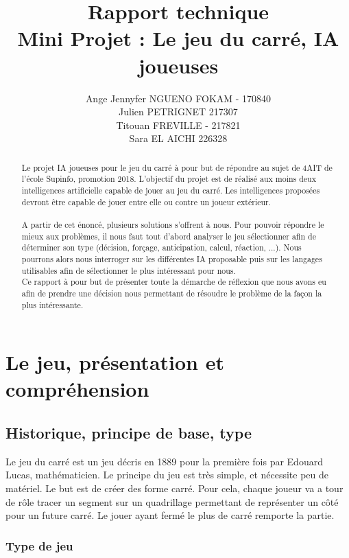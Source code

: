 \documentclass[a4paper,12pt]{report}
\title{Rapport technique \\Mini Projet : Le jeu du carré, IA joueuses}
\author{Ange Jennyfer NGUENO FOKAM - 170840\\Julien PETRIGNET 217307\\Titouan FREVILLE - 217821\\Sara EL AICHI 226328}
\begin{document}
\maketitle
\tableofcontents

\begin{abstract}
Le projet IA joueuses pour le jeu du carré à pour but de répondre au sujet de 4AIT de l'école Supinfo, promotion 2018. L'objectif du projet est de réalisé aux moins deux intelligences artificielle capable de jouer au jeu du carré. Les intelligences propos\'ees devront \^etre capable de jouer entre elle ou contre un joueur ext\'erieur. \\
\\
A partir de cet \'enonc\'e, plusieurs solutions s'offrent \`a nous. Pour pouvoir r\'epondre le mieux aux probl\`emes, il nous faut tout d'abord analyser le jeu s\'electionner afin de d\'eterminer son type (d\'ecision, for\c{c}age, anticipation, calcul, r\'eaction, ...). Nous pourrons alors nous interroger sur les diff\'erentes IA proposable puis sur les langages utilisables afin de s\'electionner le plus intéressant pour nous.
\\
Ce rapport \`a pour but de pr\'esenter toute la d\'emarche de r\'eflexion que nous avons eu afin de prendre une d\'ecision nous permettant de r\'esoudre le probl\`eme de la fa\c{c}on la plus intéressante.
\end{abstract}

\part{Le jeu, pr\'esentation et compr\'ehension}

\chapter{Historique, principe de base, type}
Le jeu du carr\'e est un jeu d\'ecris en 1889 pour la premi\`ere fois par Edouard Lucas, math\'ematicien. Le principe du jeu est tr\`es simple, et nécessite peu de mat\'eriel. Le but est de cr\'eer des forme carr\'e. Pour cela, chaque joueur va a tour de r\^ole tracer un segment sur un quadrillage permettant de repr\'esenter un c\^ot\'e pour un future carr\'e. Le jouer ayant ferm\'e le plus de carr\'e remporte la partie.

\section{Type de jeu}
\end{document}
